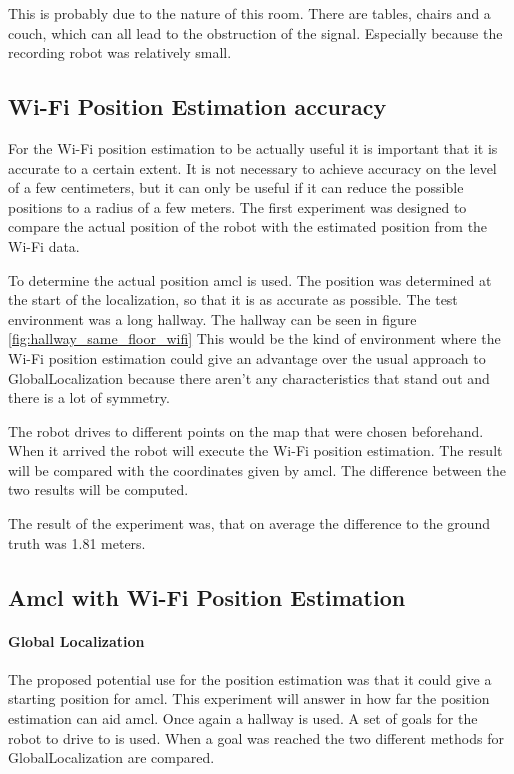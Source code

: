 This is probably due to the nature of this room. There are tables, chairs and a couch, which can all lead to the obstruction of the signal. Especially because the recording robot was relatively small. 

\subsection{Wi-Fi Position Estimation accuracy}\label{sec:acc}
For the Wi-Fi position estimation to be actually useful it is important that it is accurate to a certain extent. It is not necessary to achieve accuracy on the level of a few centimeters, but it can only be useful if it can reduce the possible positions to a radius of a few meters. The first experiment was designed to compare the actual position of the robot with the estimated position from the Wi-Fi data. 

To determine the actual position amcl is used. The position was determined at the start of the localization, so that it is as accurate as possible. The test environment was a long hallway. The hallway can be seen in figure \ref{fig:hallway_same_floor_wifi} This would be the kind of environment where the Wi-Fi position estimation could give an advantage over the usual approach to \gls{GlobalLocalization} because there aren't any characteristics that stand out and there is a lot of symmetry. 

The robot drives to different points on the map that were chosen beforehand. When it arrived the robot will execute the Wi-Fi position estimation. The result will be compared with the coordinates given by amcl. The difference between the two results will be computed.

The result of the experiment was, that on average the difference to the ground truth was 1.81 meters.
\subsection{Amcl with Wi-Fi Position Estimation}\label{sec:wifiposamcl}
\paragraph{Global Localization}
The proposed potential use for the position estimation was that it could give a starting position for amcl. This experiment will answer in how far the position estimation can aid amcl. Once again a hallway is used. A set of goals for the robot to drive to is used. When a goal was reached the two different methods for \gls{GlobalLocalization} are compared.

